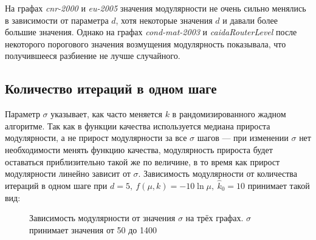 На графах \emph{cnr-2000} и \emph{eu-2005} значения модулярности не очень сильно менялись в зависимости от параметра $d$, хотя некоторые значения $d$ и давали более большие значения. Однако на графах \emph{cond-mat-2003} и \emph{caidaRouterLevel} после некоторого порогового значения возмущения модулярность показывала, что получившееся разбиение не лучше случайного.



\subsection{Количество итераций в одном шаге}

Параметр $\sigma$ указывает, как часто меняется $k$ в рандомизированного жадном алгоритме. Так как в функции качества используется медиана прироста модулярности, а не прирост модулярности за все $\sigma$ шагов --- при изменении $\sigma$ нет необходимости менять функцию качества, модулярность прироста будет оставаться приблизительно такой же по величине, в то время как прирост модулярности линейно зависит от $\sigma$. Зависимость модулярности от количества итераций в одном шаге при $d = 5,\ f(\mu, k) = -10 \ln \mu,\ \hat{k}_0 = 10$ принимает такой вид:

\begin{figure}[H]
	\columnwidth
	\columnwidth
	\caption{Зависимость модулярности от значения $\sigma$ на трёх графах. $\sigma$ принимает значения от 50 до 1400}
\end{figure}

